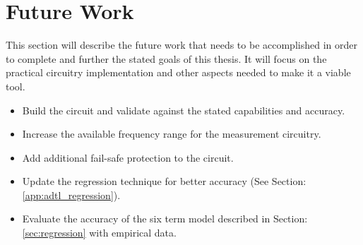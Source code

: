 \section {Future Work}
\label{sec:futureWork}

This section will describe the future work that needs to be accomplished in order to complete and further the stated goals of this thesis. It will focus on the practical circuitry implementation and other aspects needed to make it a viable tool.

\begin{itemize}
    \item Build the circuit and validate against the stated capabilities and accuracy.
    \item Increase the available frequency range for the measurement circuitry.
    \item Add additional fail-safe protection to the circuit.
    \item Update the regression technique for better accuracy (See Section: \ref{app:adtl_regression}).
    \item Evaluate the accuracy of the six term model described in Section: \ref{sec:regression} with empirical data.
\end{itemize}

